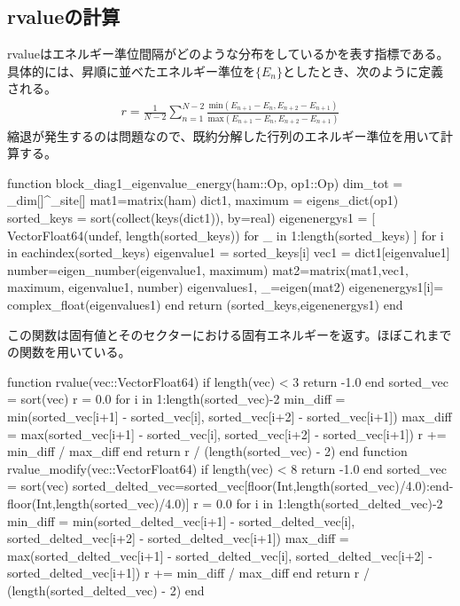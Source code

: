 \documentclass{ltjsarticle}
\begin{document}
\subsection{rvalueの計算}
rvalueはエネルギー準位間隔がどのような分布をしているかを表す指標である。\\
具体的には、昇順に並べたエネルギー準位を$\lbrace E_n \rbrace$としたとき、次のように定義される。
\begin{align}
  r = \frac{1}{N-2}\sum_{n=1}^{N-2} \frac{\mathrm{min}(E_{n+1}-E_n,E_{n+2}-E_{n+1})}{\mathrm{max}(E_{n+1}-E_n,E_{n+2}-E_{n+1})}
\end{align}
縮退が発生するのは問題なので、既約分解した行列のエネルギー準位を用いて計算する。\\
\begin{jllisting}
function block_diag1_eigenvalue_energy(ham::Op, op1::Op)
  dim_tot = _dim[]^_site[]
  mat1=matrix(ham)
  dict1, maximum = eigens_dict(op1)
  sorted_keys = sort(collect(keys(dict1)), by=real)
  eigenenergys1 = [ Vector{Float64}(undef, length(sorted_keys)) for _ in 1:length(sorted_keys) ]
  for i in eachindex(sorted_keys)
    eigenvalue1 = sorted_keys[i]
    vec1 = dict1[eigenvalue1]
    number=eigen_number(eigenvalue1, maximum)
    mat2=matrix(mat1,vec1, maximum, eigenvalue1, number)
    eigenvalues1, _=eigen(mat2)
    eigenenergys1[i]= complex_float(eigenvalues1)
  end
  return (sorted_keys,eigenenergys1)
end
\end{jllisting}
この関数は固有値とそのセクターにおける固有エネルギーを返す。ほぼこれまでの関数を用いている。\\
\begin{jllisting}
function rvalue(vec::Vector{Float64})
  if length(vec) < 3
    return -1.0
  end
  sorted_vec = sort(vec)
  r = 0.0
  for i in 1:length(sorted_vec)-2
    min_diff = min(sorted_vec[i+1] - sorted_vec[i], sorted_vec[i+2] - sorted_vec[i+1])
    max_diff = max(sorted_vec[i+1] - sorted_vec[i], sorted_vec[i+2] - sorted_vec[i+1])
    r += min_diff / max_diff
  end
  return r / (length(sorted_vec) - 2)
end
function rvalue_modify(vec::Vector{Float64})
  if length(vec) < 8
    return -1.0
  end
  sorted_vec = sort(vec)
  sorted_delted_vec=sorted_vec[floor(Int,length(sorted_vec)/4.0):end-floor(Int,length(sorted_vec)/4.0)]
  r = 0.0
  for i in 1:length(sorted_delted_vec)-2
    min_diff = min(sorted_delted_vec[i+1] - sorted_delted_vec[i], sorted_delted_vec[i+2] - sorted_delted_vec[i+1])
    max_diff = max(sorted_delted_vec[i+1] - sorted_delted_vec[i], sorted_delted_vec[i+2] - sorted_delted_vec[i+1])
    r += min_diff / max_diff
  end
  return r / (length(sorted_delted_vec) - 2)
end
\end{jllisting}
\end{document}
